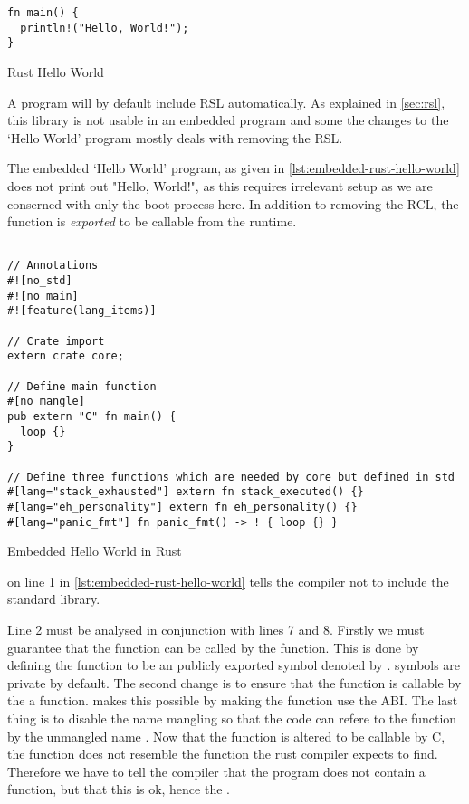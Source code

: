 \begin{listing}[H]
  \begin{verbatim}
fn main() {
  println!("Hello, World!");
}
  \end{verbatim}
  \caption{Rust Hello World}
  \label{lst:rust-hello-world}
\end{listing}

A {\rust} program will by default include \gls{RSL} automatically.
As explained in \autoref{sec:rsl}, this library is not usable in an embedded program and some the changes to the `Hello World' program mostly deals with removing the \gls{RSL}.

The embedded `Hello World' program, as given in \autoref{lst:embedded-rust-hello-world} does not print out "Hello, World!", as this requires irrelevant setup as we are conserned with only the boot process here.
In addition to removing the \gls{RCL}, the {\main} function is \emph{exported} to be callable from the {\C} runtime.

\begin{listing}[H]
  \begin{verbatim}

// Annotations
#![no_std]
#![no_main]
#![feature(lang_items)]

// Crate import
extern crate core;

// Define main function
#[no_mangle]
pub extern "C" fn main() {
  loop {}
}

// Define three functions which are needed by core but defined in std
#[lang="stack_exhausted"] extern fn stack_executed() {}
#[lang="eh_personality"] extern fn eh_personality() {}
#[lang="panic_fmt"] fn panic_fmt() -> ! { loop {} }
\end{verbatim}
\caption{Embedded Hello World in Rust}
\label{lst:embedded-rust-hello-world}
\end{listing}

\attrib{\#\![no\_std]} on line 1 in \autoref{lst:embedded-rust-hello-world} tells the {\rust} compiler not to include the standard library.

Line 2 must be analysed in conjunction with lines 7 and 8.
Firstly we must guarantee that the function can be called by the  function.
This is done by defining the {\main} function to be an publicly exported symbol denoted by .
{\rust} symbols are private by default.
The second change is to ensure that the function is callable by the a {\C} function.
 makes this possible by making the function use the {\C} ABI. 
The last thing is to disable the {\rust} name mangling so that the {\C} code can refere to the function by the unmangled name {\main}.
Now that the {\main} function is altered to be callable by C, the function does not resemble the function the rust compiler expects to find.
Therefore we have to tell the compiler that the program does not contain a {\main} function, but that this is ok, hence the \attrib{\#\![no\_main]}.

